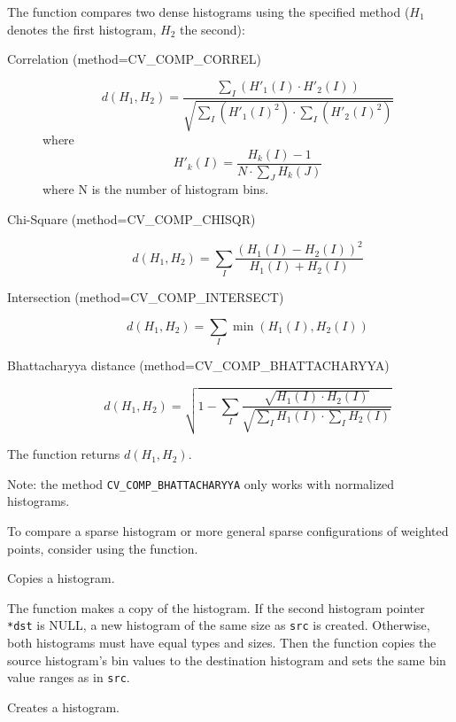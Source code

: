 The function compares two dense histograms using the specified method ($H_1$ denotes the first histogram, $H_2$ the second):

\begin{description}
\item[Correlation (method=CV\_COMP\_CORREL)]
\[
d(H_1,H_2) = \frac
{\sum_I (H'_1(I) \cdot H'_2(I))}
{\sqrt{\sum_I(H'_1(I)^2) \cdot \sum_I(H'_2(I)^2)}}
\]
where
\[
H'_k(I) = \frac{H_k(I) - 1}{N \cdot \sum_J H_k(J)}
\]
where N is the number of histogram bins.

\item[Chi-Square (method=CV\_COMP\_CHISQR)]
\[ d(H_1,H_2) = \sum_I \frac{(H_1(I)-H_2(I))^2}{H_1(I)+H_2(I)} \]

\item[Intersection (method=CV\_COMP\_INTERSECT)]
\[ d(H_1,H_2) = \sum_I \min (H_1(I), H_2(I)) \]

\item[Bhattacharyya distance (method=CV\_COMP\_BHATTACHARYYA)]
\[ d(H_1,H_2) = \sqrt{1 - \sum_I \frac{\sqrt{H_1(I) \cdot H_2(I)}}{ \sqrt { \sum_I H_1(I) \cdot \sum_I H_2(I) }}} \]

\end{description}

The function returns $d(H_1, H_2)$.

Note: the method \texttt{CV\_COMP\_BHATTACHARYYA} only works with normalized histograms.

To compare a sparse histogram or more general sparse configurations of weighted points, consider using the  function.

\ifC
{}
Copies a histogram.


\begin{description}
\end{description}

The function makes a copy of the histogram. If the
second histogram pointer \texttt{*dst} is NULL, a new histogram of the
same size as \texttt{src} is created. Otherwise, both histograms must
have equal types and sizes. Then the function copies the source histogram's
bin values to the destination histogram and sets the same bin value ranges
as in \texttt{src}.

\fi

Creates a histogram.

